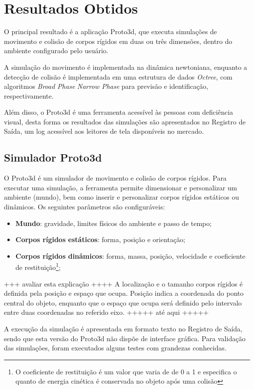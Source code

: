\documentclass[12pt]{article}
\begin{document}
\section{Resultados Obtidos}
O principal resultado é a aplicação Proto3d, que executa simulações de movimento e colisão de corpos rígidos em duas ou três dimensões, dentro do ambiente configurado pelo usuário. 

A simulação do movimento é implementada na dinâmica newtoniana, enquanto a detecção de colisão é implementada em uma estrutura de dados \emph{Octree}, com algoritmos \emph{Broad Phase} \emph{Narrow Phase} para previsão e identificação, respectivamente.

Além disso, o Proto3d é uma ferramenta acessível às pessoas com deficiência visual, desta forma os resultados das simulações são apresentados no Registro de Saída, um log acessível aos leitores de tela disponíveis no mercado.

\subsection{Simulador Proto3d}
O Proto3d é um simulador de movimento e colisão de corpos rígidos. Para executar uma simulação, a ferramenta permite dimensionar e personalizar um ambiente (mundo), bem como inserir e personalizar corpos rígidos estáticos ou dinâmicos. Os seguintes parâmetros são configuráveis:
\begin{itemize}
	\item \textbf{Mundo}: gravidade, limites físicos do ambiente e passo de tempo;
	\item \textbf{Corpos rígidos estáticos}: forma, posição e orientação;
	\item \textbf{Corpos rígidos dinâmicos}: forma, massa, posição, velocidade e coeficiente de restituição\footnote{O coeficiente de restituição é um valor que varia de de 0 a 1 e especifica o quanto de energia cinética é conservada no objeto após uma colisão};
\end{itemize}

+++ avaliar esta explicação ++++
A localização e o tamanho corpos rígidos é definida pela posição e espaço que ocupa. Posição indica a coordenada do ponto central do objeto, enquanto que o espaço que ocupa será definido pelo intervalo entre duas coordenadas no referido eixo.
+++++ até aqui +++++

A execução da simulação é apresentada em formato texto no Registro de Saída, sendo que esta versão do Proto3d não dispõe de interface gráfica. Para validação das simulações, foram executados alguns testes com grandezas conhecidas. 
\end{document}
